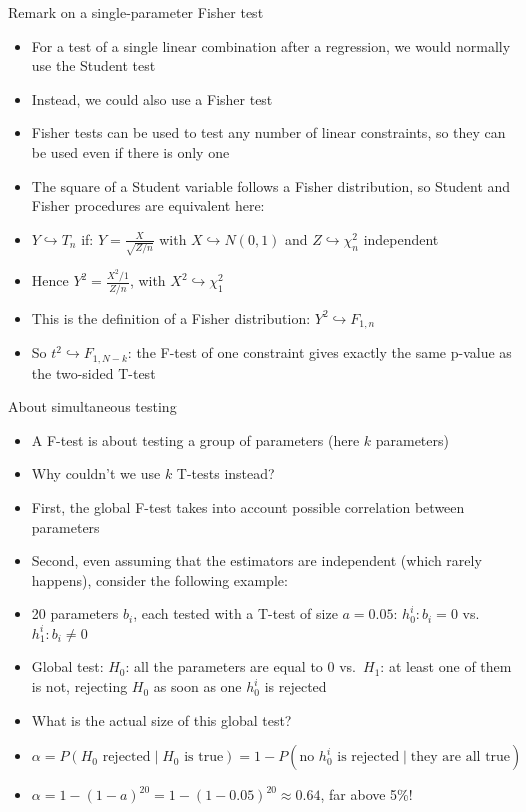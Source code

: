 \documentclass[aspectratio=169]{beamer}
\begin{document}
\begin{frame}{Remark on a single-parameter Fisher test}
\begin{itemize}
    \item For a test of a single linear combination after a regression, we would normally use the Student test
    \item Instead, we could also use a Fisher test
    \item Fisher tests can be used to test any number of linear constraints, so they can be used even if there is only one
    \item The square of a Student variable follows a Fisher distribution, so Student and Fisher procedures are equivalent here:
    \item $Y \hookrightarrow T_n$ if: $Y = \frac{X}{\sqrt{Z/n}}$ with $X \hookrightarrow N(0,1)$ and $Z \hookrightarrow \chi_n^2$ independent
    \item Hence $Y^2 = \frac{X^2/1}{Z/n}$, with $X^2 \hookrightarrow \chi_1^2$
    \item This is the definition of a Fisher distribution: $Y^2 \hookrightarrow F_{1,n}$
    \item So $t^2 \hookrightarrow F_{1,N-k}$: the F-test of one constraint gives exactly the same p-value as the two-sided T-test
\end{itemize}
\end{frame}

\begin{frame}{About simultaneous testing}
\begin{itemize}
    \item A F-test is about testing a group of parameters (here $k$ parameters)
    \item Why couldn't we use $k$ T-tests instead?
    \item First, the global F-test takes into account possible correlation between parameters
    \item Second, even assuming that the estimators are independent (which rarely happens), consider the following example:
    \item 20 parameters $b_i$, each tested with a T-test of size $a = 0.05$: $h_0^i: b_i = 0$ vs.\ $h_1^i: b_i \neq 0$
    \item Global test: $H_0$: all the parameters are equal to 0 vs.\ $H_1$: at least one of them is not, rejecting $H_0$ as soon as one $h_0^i$ is rejected
    \item What is the actual size of this global test?
    \item $\alpha = P(H_0 \text{ rejected} \mid H_0 \text{ is true}) = 1 - P(\text{no } h_0^i \text{ is rejected} \mid \text{they are all true})$
    \item $\alpha = 1 - (1-a)^{20} = 1 - (1-0.05)^{20} \approx 0.64$, far above 5\%!
\end{itemize}
\end{frame}
\end{document}
